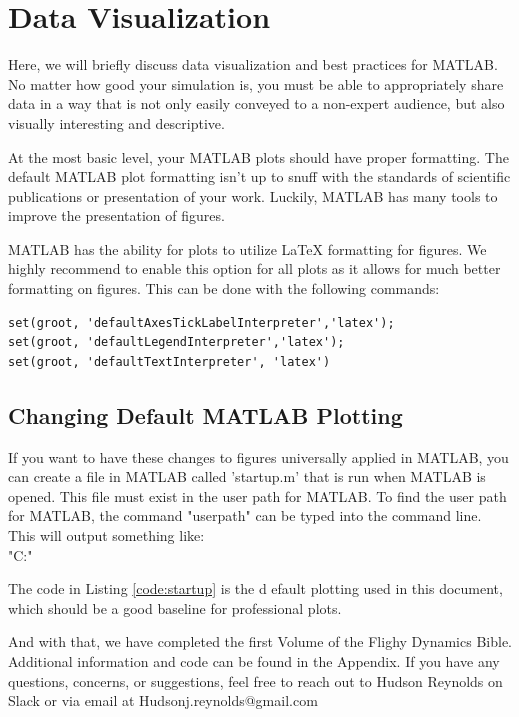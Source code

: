 \documentclass[12pt]{report}
\begin{document}
\section{Data Visualization}
Here, we will briefly discuss data visualization and best practices for MATLAB. No matter how good your simulation is, you must be able to appropriately share data in a way that is not only easily conveyed to a non-expert audience, but also visually interesting and descriptive.

At the most basic level, your MATLAB plots should have proper formatting. The default MATLAB plot formatting isn't up to snuff with the standards of scientific publications or presentation of your work. Luckily, MATLAB has many tools to improve the presentation of figures.

MATLAB has the ability for plots to utilize LaTeX formatting for figures. We highly recommend to enable this option for all plots as it allows for much better formatting on figures. This can be done with the following commands:
\begin{lstlisting}[style=Matlab-editor]
set(groot, 'defaultAxesTickLabelInterpreter','latex');
set(groot, 'defaultLegendInterpreter','latex');
set(groot, 'defaultTextInterpreter', 'latex')
\end{lstlisting}
\subsection{Changing Default MATLAB Plotting}
If you want to have these changes to figures universally applied in MATLAB, you can create a file in MATLAB called 'startup.m' that is run when MATLAB is opened. This file must exist in the user path for MATLAB. To find the user path for MATLAB, the command "userpath" can be typed into the command line. This will output something like:
\\
"C:\Users\YourName\OneDrive\Documents\MATLAB"

The code in Listing \ref{code:startup} is the d efault plotting used in this document, which should be a good baseline for professional plots.
\label{code:startup}

And with that, we have completed the first Volume of the Flighy Dynamics Bible. Additional information and code can be found in the Appendix. If you have any questions, concerns, or suggestions, feel free to reach out to Hudson Reynolds on Slack or via email at Hudsonj.reynolds@gmail.com
\end{document}

